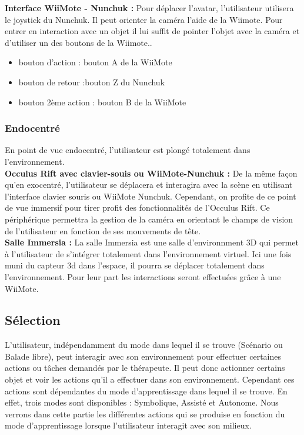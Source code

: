 \textbf{Interface WiiMote - Nunchuk : }
Pour déplacer l’avatar, l’utilisateur utilisera le joystick du Nunchuk. Il peut orienter la caméra l’aide de la Wiimote. Pour entrer en interaction avec un objet il lui suffit de pointer l’objet avec la caméra et d’utiliser un des boutons de la Wiimote..
	\begin{itemize}
  				\item bouton d’action : bouton A de la WiiMote
				 \item bouton de retour :bouton Z du Nunchuk
  				\item  bouton 2ème action : bouton B de la WiiMote
			\end{itemize}

\subsubsection{Endocentré}
En point de vue endocentré, l’utilisateur est plongé totalement dans l’environnement. 
\\
\textbf{Occulus Rift avec clavier-souis ou WiiMote-Nunchuk : }
De la même façon qu’en exocentré, l’utilisateur se déplacera et interagira avec la scène en utilisant l’interface clavier souris ou WiiMote Nunchuk. Cependant, on profite de ce point de vue immersif pour tirer profit des fonctionnalités de l’Occulus Rift.
Ce périphérique permettra la gestion de la caméra en orientant le champs de vision de l’utilisateur en fonction de ses mouvements de tête.
\\
\textbf{Salle Immersia : }
La salle Immersia est une salle d’environnment 3D qui permet à l’utilisateur de s’intégrer totalement dans l’environnement virtuel. Ici une fois muni du capteur 3d dans l'espace, il pourra se déplacer totalement dans l’environnement.
Pour leur part les interactions seront effectuées grâce à une WiiMote.

\subsection{Sélection}

L'utilisateur, indépendamment du mode dans lequel il se trouve (Scénario ou Balade libre), peut interagir avec son environnement pour effectuer certaines actions ou tâches demandés par le thérapeute. Il peut donc actionner certains objet et voir les actions qu'il a effectuer dans son environnement. Cependant ces actions sont dépendantes du mode d'apprentissage dans lequel il se trouve. En effet, trois modes sont disponibles : Symbolique, Assisté et Autonome. Nous verrons dans cette partie les différentes actions qui se produise en fonction du mode d'apprentissage lorsque l'utilisateur interagit avec son milieux. 

